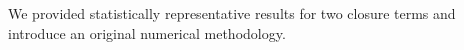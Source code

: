 We provided statistically representative results for two closure terms and introduce an original numerical methodology.